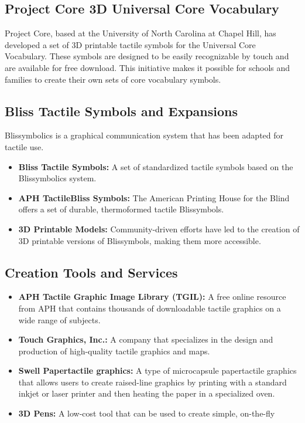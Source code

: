 \subsection{Project Core 3D Universal Core Vocabulary}\label{app6:project-core}
Project Core, based at the University of North Carolina at Chapel Hill, has developed a set of 3D printable tactile symbols for the Universal Core Vocabulary. These symbols are designed to be easily recognizable by touch and are available for free download. This initiative makes it possible for schools and families to create their own sets of core vocabulary symbols.\supercite{64ouncebraille}

\subsection{Bliss Tactile Symbols and Expansions}\label{app6:bliss-symbols}
Blissymbolics is a graphical communication system that has been adapted for tactile use.
\begin{itemize}
	\item \textbf{Bliss Tactile Symbols:} A set of standardized tactile symbols based on the Blissymbolics system.
	\item \textbf{APH TactileBliss Symbols:} The American Printing House for the Blind offers a set of durable, thermoformed tactile Blissymbols.
	\item \textbf{3D Printable Models:} Community-driven efforts have led to the creation of 3D printable versions of Blissymbols, making them more accessible.
\end{itemize}

\subsection{ Creation Tools and Services}\label{app6:tactile-graphics}
\begin{itemize}
	\item \textbf{APH Tactile Graphic Image Library (TGIL):} A free online resource from APH that contains thousands of downloadable tactile graphics on a wide range of subjects.
	\item \textbf{Touch Graphics, Inc.:} A company that specializes in the design and production of high-quality tactile graphics and maps.
	\item \textbf{Swell Papertactile graphics:} A type of microcapsule papertactile graphics that allows users to create raised-line graphics by printing with a standard inkjet or laser printer and then heating the paper in a specialized oven.
	\item \textbf{3D Pens:} A low-cost tool that can be used to create simple, on-the-fly
\end{itemize}


